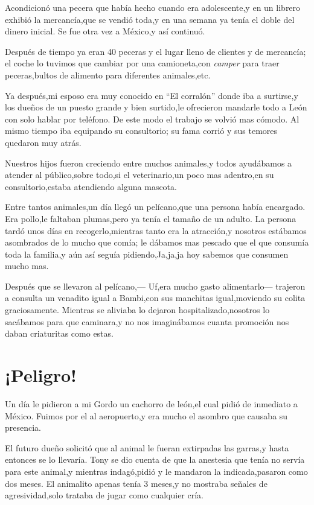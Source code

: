 \documentclass[letterpaper,12pt]{book}
\begin{document}
Acondicionó una pecera que había hecho cuando era adolescente,y en un librero exhibió la mercancía,que se vendió toda,y en una semana ya tenía el doble del dinero inicial. Se fue otra vez a México,y así continuó. 

Después de tiempo ya eran 40 peceras y el lugar lleno de clientes y de mercancía; el coche lo tuvimos que cambiar por una camioneta,con {\it camper}\/ para traer peceras,bultos de alimento para diferentes animales,etc. 

Ya después,mi esposo era muy conocido en ``El corralón'' donde iba a surtirse,y los dueños de un puesto grande y bien surtido,le ofrecieron mandarle todo a León con solo hablar por teléfono. De este modo el trabajo se volvió mas cómodo. Al mismo tiempo iba equipando su consultorio; su fama corrió y sus temores quedaron muy atrás.

Nuestros hijos fueron creciendo entre muchos animales,y todos ayudábamos a atender al público,sobre todo,si el veterinario,un poco mas adentro,en su consultorio,estaba atendiendo alguna mascota.

Entre tantos animales,un día llegó un pelícano,que una persona había encargado. Era pollo,le faltaban plumas,pero ya tenía el tamaño de un adulto.
 La persona tardó unos días en recogerlo,mientras tanto era la atracción,y nosotros estábamos asombrados de lo mucho que comía; le dábamos mas pescado que el que consumía toda la familia,y aún así seguía pidiendo,Ja,ja,ja hoy sabemos que consumen mucho mas.
 
 Después que se llevaron al pelícano,--- Uf,era mucho gasto alimentarlo--- trajeron a consulta un venadito igual a Bambi,con sus manchitas igual,moviendo su colita graciosamente. Mientras se aliviaba lo dejaron hospitalizado,nosotros lo sacábamos para que caminara,y no nos imaginábamos cuanta promoción nos daban criaturitas como estas.
\chapter{¡Peligro!}
Un día le pidieron a mi Gordo un cachorro de león,el cual pidió de inmediato a México. Fuimos por el al aeropuerto,y era mucho el asombro que causaba su presencia.

El futuro dueño solicitó que al animal le fueran extirpadas las garras,y hasta entonces se lo llevaría. Tony se dio cuenta de que la anestesia que tenía no servía para este animal,y mientras indagó,pidió y le mandaron la indicada,pasaron como dos meses. El animalito apenas tenía 3 meses,y no mostraba señales de agresividad,solo trataba de jugar como cualquier cría.
\end{document}
